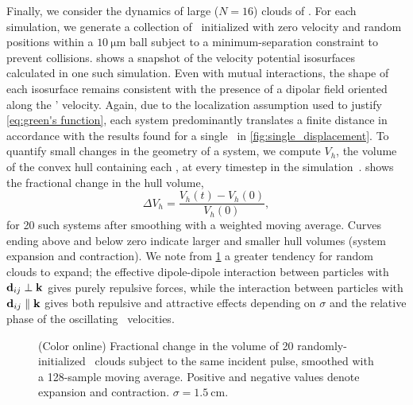 Finally, we consider the dynamics of large ($N=16$) clouds of \bubbles.
For each simulation, we generate a collection of \bubbles\ initialized with zero velocity and random positions within a $\SI{10}{\micro\meter}$ ball subject to a minimum-separation constraint to prevent collisions.
 shows a snapshot of the velocity potential isosurfaces calculated in one such simulation. Even with mutual interactions, the shape of each isosurface remains consistent with the presence of a dipolar field oriented along the \bubbles' velocity.
Again, due to the localization assumption used to justify \cref{eq:green's function}, each system predominantly translates a finite distance in accordance with the results found for a single \bubble\ in \cref{fig:single_displacement}.
To quantify small changes in the geometry of a system, we compute $V_h$, the volume of the convex hull containing each \bubble, at every timestep in the simulation~\cite{SciPy}.
 shows the fractional change in the hull volume,
\begin{equation}
  \Delta V_h = \frac{V_h(t) - V_h(0)}{V_h(0)},
\end{equation}
for 20 such systems after smoothing with a weighted moving average.
Curves ending above and below zero indicate larger and smaller hull volumes (system expansion and contraction).
We note from \cref{fig:hull change} a greater tendency for random clouds to expand; the effective dipole-dipole interaction between particles with $\vb{d}_{ij} \perp \vb{k}$ gives purely repulsive forces, while the interaction between particles with $\vb{d}_{ij} \parallel \vb{k}$ gives both repulsive and attractive effects depending on $\sigma$ and the relative phase of the oscillating \bubble\ velocities.

\begin{figure}
  \centering
  
  \caption{\label{fig:hull change}(Color online)
    Fractional change in the volume of 20 randomly-initialized \bubble\ clouds subject to the same incident pulse, smoothed with a 128-sample moving average.
    Positive and negative values denote expansion and contraction. $\sigma = \SI{1.5}{\centi\meter}$.
  }
\end{figure}
